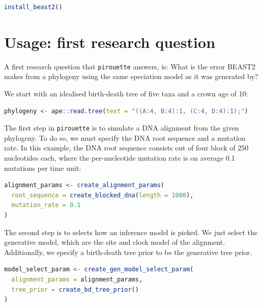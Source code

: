 \documentclass{article}
\begin{document}
\begin{lstlisting}[language=R, floatplacement=H]
install_beast2()
\end{lstlisting}


\section{Usage: first research question}

A first research question that \verb;pirouette; answers, is:
What is the error BEAST2 makes from a phylogeny using the same 
speciation model as it was generated by?

We start with an idealised birth-death tree of five taxa and a crown age of 10:

\begin{lstlisting}[language=R, floatplacement=H]
phylogeny <- ape::read.tree(text = "((A:4, B:4):1, (C:4, D:4):1);")
\end{lstlisting}

The first step in \verb;pirouette; is to simulate a DNA alignment from the 
given phylogeny. To do so, we must specify the DNA root sequence
and a mutation rate. In this example, the DNA root sequence consists
out of four block of 250 nucleotides each, where the per-nucleotide
mutation rate is on average 0.1 mutations per time unit:

\begin{lstlisting}[language=R, floatplacement=H]
alignment_params <- create_alignment_params(
  root_sequence = create_blocked_dna(length = 1000),
  mutation_rate = 0.1
)
\end{lstlisting}

The second step is to selects how an inference model is picked.
We just select the generative model, which are the site and clock
model of the alignment. Additionally, we specify a birth-death tree prior
to be the generative tree prior.

\begin{lstlisting}[language=R, floatplacement=H]
model_select_param <- create_gen_model_select_param(
  alignment_params = alignment_params,
  tree_prior = create_bd_tree_prior()
)
\end{lstlisting}
\end{document}

